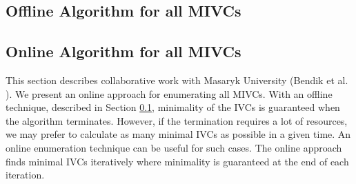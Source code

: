 \subsection{Offline Algorithm for all MIVCs}
\label{sec:offaivc}


\subsection{Online Algorithm for all MIVCs}
\label{sec:onaivc}
This section describes collaborative work with Masaryk University (Bendik et al. \cite{Jar2017}). We present an online approach for enumerating all MIVCs. With an offline technique, described in Section \ref{sec:offaivc}, minimality of the IVCs is guaranteed when the algorithm terminates. However, if the termination requires a lot of resources, we may prefer to calculate as many minimal IVCs as possible in a given time. An online enumeration technique can be useful for such cases. The online approach finds minimal IVCs iteratively where minimality is guaranteed at the end of each iteration.

